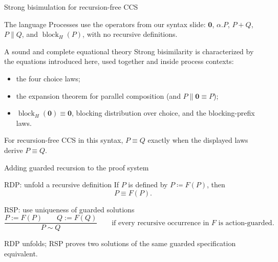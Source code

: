 \documentclass[handout,aspectratio=169,11pt]{beamer}
\newcommand{\nil}{\mathbf 0}
\newcommand{\blockact}[2]{\operatorname{block}_{#1}(#2)}
\newcommand{\Takeaway}[1]{\begin{exampleblock}{}#1\end{exampleblock}}
\begin{document}
\begin{frame}{Strong bisimulation for recursion-free CCS}
  \begin{block}{The language}
    Processes use the operators from our syntax slide:
    $\nil$, $\alpha.P$, $P+Q$, $P\parallel Q$, and $\blockact{H}{P}$,
    with no recursive definitions.
  \end{block}
  \begin{exampleblock}{A sound and complete equational theory}
    Strong bisimilarity is characterized by the equations introduced here,
    used together and inside process contexts:
    \begin{itemize}
      \item the four choice laws;
      \item the expansion theorem for parallel composition (and
            $P\parallel\nil\equiv P$);
      \item $\blockact{H}{\nil}\equiv\nil$, blocking distribution over choice,
            and the blocking-prefix laws.
    \end{itemize}
  \end{exampleblock}
  \Takeaway{For recursion-free CCS in this syntax, $P\equiv Q$ exactly when the displayed laws derive $P\equiv Q$.}
\end{frame}






\begin{frame}{Adding guarded recursion to the proof system}
  \begin{block}{RDP: unfold a recursive definition}
    If $P$ is defined by $P\coloneqq F(P)$, then
    \[
      P\equiv F(P).
    \]
  \end{block}
  \begin{exampleblock}{RSP: use uniqueness of guarded solutions}
    \[
      \frac{P:= F(P)\qquad Q:= F(Q)}
           {P\sim Q}
      \qquad\text{if every recursive occurrence in $F$ is action-guarded.}
    \]
  \end{exampleblock}
  \Takeaway{RDP unfolds; RSP proves two solutions of the same guarded specification equivalent.}
\end{frame}
\end{document}
